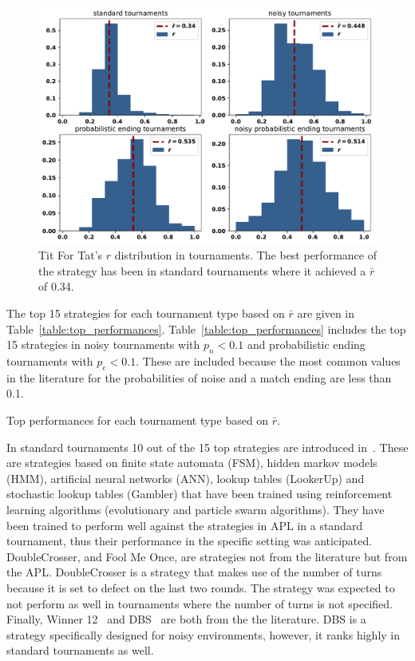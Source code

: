 \documentclass{article}
\begin{document}
\begin{figure}[!htbp]
    \centering
    \includegraphics[width=.60\textwidth]{../images/tit_for_tat_r_distributions.pdf}
    \caption{Tit For Tat's $r$ distribution in tournaments. The best performance
    of the strategy has been in standard tournaments where it achieved a $\bar{r}$
    of 0.34.}
    \label{fig:tit_for_tat_r_distribution}
\end{figure}

The top 15 strategies for each tournament type based on \(\bar{r}\) are given in
Table~\ref{table:top_performances}. Table~\ref{table:top_performances} includes
the top 15 strategies in noisy tournaments with \(p_n < 0.1\) and probabilistic
ending tournaments with \(p_e < 0.1\). These are included because the most common
values in the literature for the probabilities of noise and a match ending are
less than 0.1.

\begin{table}[!htbp]
    \begin{center}
    \resizebox{\textwidth}{!}{
        
    }
\end{center}
\caption{Top performances for each tournament type based on $\bar{r}$.}
\label{table:top_performances}
\end{table}

In standard tournaments 10 out of the 15 top strategies are introduced
in~\cite{Harper2017}. These are strategies based on finite state automata (FSM),
hidden markov models (HMM), artificial neural networks (ANN), lookup tables
(LookerUp) and stochastic lookup tables (Gambler) that have been trained using
reinforcement learning algorithms (evolutionary and particle swarm algorithms).
They have been trained to perform well against the strategies
in APL in a standard tournament, thus their performance in the
specific setting was anticipated. DoubleCrosser, and Fool Me Once, are
strategies not from the literature but from the APL. DoubleCrosser
is a strategy that makes use of the number of turns because it is set to defect on
the last two rounds. The strategy was expected to not perform as well in
tournaments where the number of turns is not specified. Finally, Winner
12~\cite{mathieu2017} and DBS~\cite{Au2006} are both from the the literature.
DBS is a strategy specifically designed for noisy environments, however, it ranks
highly in standard tournaments as well.
\end{document}
